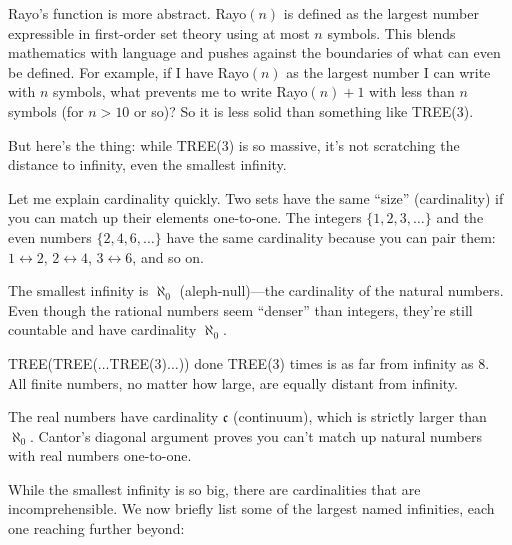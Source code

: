 Rayo's function is more abstract. Rayo$(n)$ is defined as the largest number expressible in first-order set theory using at most $n$ symbols. This blends mathematics with language and pushes against the boundaries of what can even be defined. For example, if I have Rayo$(n)$ as the largest number I can write with $n$ symbols, what prevents me to write Rayo$(n)+1$ with less than $n$ symbols (for $n>10$ or so)? So it is less solid than something like TREE(3).

But here's the thing: while TREE(3) is so massive, it's not scratching the distance to infinity, even the smallest infinity.

Let me explain cardinality quickly. Two sets have the same ``size'' (cardinality) if you can match up their elements one-to-one. The integers $\{1, 2, 3, \ldots\}$ and the even numbers $\{2, 4, 6, \ldots\}$ have the same cardinality because you can pair them: $1 \leftrightarrow 2$, $2 \leftrightarrow 4$, $3 \leftrightarrow 6$, and so on.

The smallest infinity is $\aleph_0$ (aleph-null)—the cardinality of the natural numbers. Even though the rational numbers seem ``denser'' than integers, they're still countable and have cardinality $\aleph_0$.

TREE(TREE($\ldots$TREE(3)$\ldots$)) done TREE(3) times is as far from infinity as 8. All finite numbers, no matter how large, are equally distant from infinity.

The real numbers have cardinality $\mathfrak{c}$ (continuum), which is strictly larger than $\aleph_0$. Cantor's diagonal argument proves you can't match up natural numbers with real numbers one-to-one.

While the smallest infinity is so big, there are cardinalities that are incomprehensible. We now briefly list some of the largest named infinities, each one reaching further beyond:

